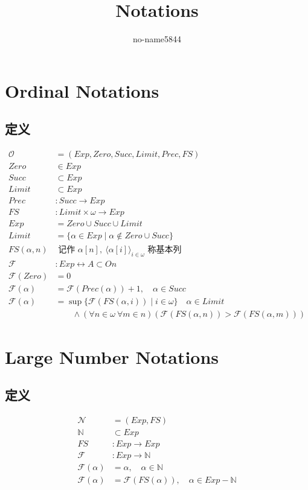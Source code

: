 \documentclass[UTF8]{ctexart}
\title{Notations}
\author{no-name5844}
\begin{document}
\maketitle

\section{Ordinal Notations}
\subsection{定义}
\begin{align*}
\mathcal{O}&=(Exp,Zero,Succ,Limit,Prec,FS)\\
Zero&\in Exp\\
Succ&\subset Exp\\
Limit&\subset Exp\\
Prec&: Succ\to Exp\\
FS&: Limit\times\omega\to Exp\\
Exp&=Zero\cup Succ\cup Limit\\
Limit&=\{\alpha\in Exp\mid\alpha\not\in Zero\cup Succ\}\\
FS(\alpha,n)&\text{ 记作 }\alpha[n],\ \langle\alpha[i]\rangle_{i\in\omega}\text{ 称基本列}\\
\mathcal{F}&: Exp\leftrightarrow A\subset On\\
\mathcal{F}(Zero)&=0\\
\mathcal{F}(\alpha)&=\mathcal{F}(Prec(\alpha))+1,\quad\alpha\in Succ\\
\mathcal{F}(\alpha)&=\sup\{\mathcal{F}(FS(\alpha,i))\mid i\in\omega\}\quad\alpha\in Limit\\
&\qquad\land(\forall n\in\omega\ \forall m\in n)(\mathcal{F}(FS(\alpha,n))>\mathcal{F}(FS(\alpha,m)))
\end{align*}

\section{Large Number Notations}
\subsection{定义}
\begin{align*}
\mathcal{N}&=(Exp,FS)\\
\mathbb{N}&\subset Exp\\
FS&: Exp\to Exp\\
\mathcal{F}&: Exp\to\mathbb{N}\\
\mathcal{F}(\alpha)&=\alpha,\quad\alpha\in\mathbb{N}\\
\mathcal{F}(\alpha)&=\mathcal{F}(FS(\alpha)),\quad\alpha\in Exp-\mathbb{N}
\end{align*}
\end{document}
